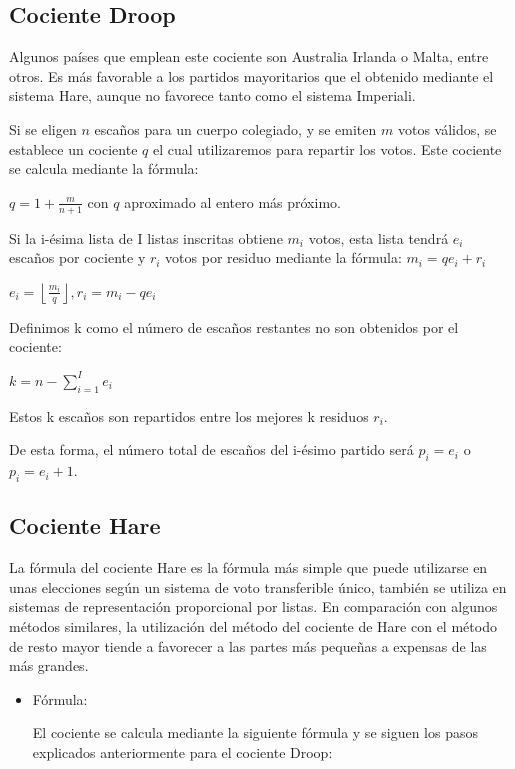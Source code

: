 \documentclass[12pt,a4paper,]{book}
\numberwithin{dummy}{section}
\theoremstyle{ocrenumbox}
\theoremstyle{blacknumex}
\theoremstyle{blacknumbox}
\theoremstyle{ocrenum}
\theoremstyle{ocrenum}
\begin{document}
\hypertarget{cociente-droop}{%
\subsection{Cociente Droop}\label{cociente-droop}}

Algunos países que emplean este cociente son Australia Irlanda o Malta,
entre otros. Es más favorable a los partidos mayoritarios que el
obtenido mediante el sistema Hare, aunque no favorece tanto como el
sistema Imperiali.

Si se eligen \({n}\) escaños para un cuerpo colegiado, y se emiten
\({m}\) votos válidos, se establece un cociente \({q}\) el cual
utilizaremos para repartir los votos. Este cociente se calcula mediante
la fórmula:

\({q=1+{\frac {m}{n+1}}}\) con \(q\) aproximado al entero más próximo.

Si la i-ésima lista de I listas inscritas obtiene \({m_{i}}\) votos,
esta lista tendrá \({e_{i}}\) escaños por cociente y \({r_{i}}\) votos
por residuo mediante la fórmula: \({m_{i}=qe_{i}+r_{i}}\)

\({e_{i}=\left\lfloor {\frac {m_{i}}{q}}\right\rfloor ,r_{i}=m_{i}-qe_{i}}\)

Definimos k como el número de escaños restantes no son obtenidos por el
cociente:

\({k=n-\sum _{i=1}^{I}e_{i}}\)

Estos k escaños son repartidos entre los mejores k residuos \({r_{i}}\).

De esta forma, el número total de escaños del i-ésimo partido será
\({p_{i}=e_{i}}\) o \({p_{i}=e_{i}+1}\).

\hypertarget{cociente-hare}{%
\subsection{Cociente Hare}\label{cociente-hare}}

La fórmula del cociente Hare es la fórmula más simple que puede
utilizarse en unas elecciones según un sistema de voto transferible
único, también se utiliza en sistemas de representación proporcional por
listas. En comparación con algunos métodos similares, la utilización del
método del cociente de Hare con el método de resto mayor tiende a
favorecer a las partes más pequeñas a expensas de las más grandes.

\begin{itemize}
\item
  Fórmula:

  El cociente se calcula mediante la siguiente fórmula y se siguen los
  pasos explicados anteriormente para el cociente Droop:
\end{itemize}
\end{document}

